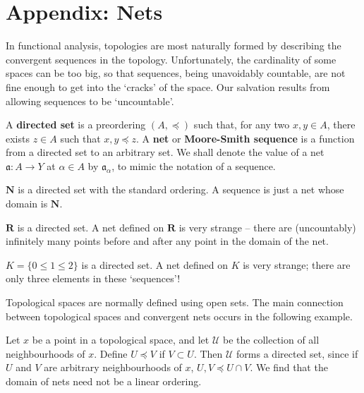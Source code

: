 \chapter{Appendix: Nets}

In functional analysis, topologies are most naturally formed by describing the convergent sequences in the topology. Unfortunately, the cardinality of some spaces can be too big, so that sequences, being unavoidably countable, are not fine enough to get into the `cracks' of the space. Our salvation results from allowing sequences to be `uncountable'.

\begin{definition}
    A {\bf directed set} is a preordering $(A, \preceq)$ such that, for any two $x,y \in A$, there exists $z \in A$ such that $x,y \preceq z$. A {\bf net} or {\bf Moore-Smith sequence} is a function from a directed set to an arbitrary set. We shall denote the value of a net $\mathfrak{a}:A \to Y$ at $\alpha \in A$ by $\mathfrak{a}_\alpha$, to mimic the notation of a sequence.
\end{definition}

\begin{example}
    $\mathbf{N}$ is a directed set with the standard ordering. A sequence is just a net whose domain is $\mathbf{N}$.
\end{example}

\begin{example}
    $\mathbf{R}$ is a directed set. A net defined on $\mathbf{R}$ is very strange -- there are (uncountably) infinitely many points before and after any point in the domain of the net.
\end{example}

\begin{example}
    $K = \{ 0 \leq 1 \leq 2 \}$ is a directed set. A net defined on $K$ is very strange; there are only three elements in these `sequences'!
\end{example}

Topological spaces are normally defined using open sets. The main connection between topological spaces and convergent nets occurs in the following example.

\begin{example}
    Let $x$ be a point in a topological space, and let $\mathcal{U}$ be the collection of all neighbourhoods of $x$. Define $U \preceq V$ if $V \subset U$. Then $\mathcal{U}$ forms a directed set, since if $U$ and $V$ are arbitrary neighbourhoods of $x$, $U, V \preceq U \cap V$. We find that the domain of nets need not be a linear ordering.
\end{example}

